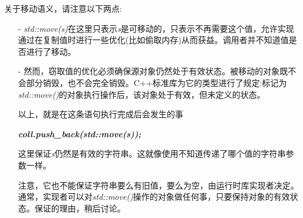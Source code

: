 \begin{itemize}
\begin{center}
	\end{center}
	关于移动语义，请注意以下两点:\par
	\begin{itemize}
		\item[-] \textit{std::move(s)}在这里只表示\textit{s}是可移动的，只表示不再需要这个值，允许实现通过在复制值时进行一些优化(比如偷取内存)从而获益。调用者并不知道值是否进行了移动。
		\item[-] 然而，窃取值的优化必须确保源对象仍然处于有效状态。被移动的对象既不会部分销毁，也不会完全销毁。C++标准库为它的类型进行了规定:标记为\textit{std::move()}的对象执行操作后，该对象处于有效，但未定义的状态。\par
		以上，就是在这条语句执行完成后会发生的事\par
		\textit{\textbf{coll.push\_back(std::move(s));}}\par
		这里保证\textit{s}仍然是有效的字符串。这就像使用不知道传递了哪个值的字符串参数一样。\par
		注意，它也不能保证字符串要么有旧值，要么为空，由运行时库实现者决定。通常，实现者可以对\textit{std::move()}操作的对象做任何事，只要保持对象的有效状态。保证的理由，稍后讨论。
	\end{itemize}
	

\end{itemize}
